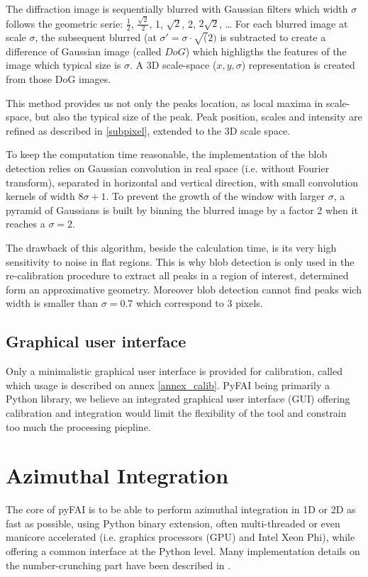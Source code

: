 \documentclass[preprint]{iucr}
\begin{document}
The diffraction image is sequentially blurred with Gaussian filters which
width $\sigma$ follows the geometric serie: $\frac{1}{2}$,
$\frac{\sqrt{2}}{2}$, 1, $\sqrt{2}$, 2, $2\sqrt{2}$, \ldots
For each blurred image at scale $\sigma$, the subsequent blurred (at
$\sigma'=\sigma\cdot\sqrt(2)$
is subtracted to create a difference of Gaussian
image (called $DoG$) which highligths the features of the image which typical
size is $\sigma$. 
A 3D scale-space ($x,y,\sigma$) representation is created from those DoG images.

This method provides us not only the peaks location, as local maxima in
scale-space, but also the typical size of the peak. 
Peak position, scales and intensity are refined as described in
\ref{subpixel}, extended to the 3D scale space.

To keep the computation time reasonable, the implementation of the blob
detection relies on Gaussian convolution in real space (i.e. without Fourier
transform), separated in horizontal and vertical direction, with small
convolution kernels of width $8 \sigma +1$.
To prevent the growth of the window with larger $\sigma$, a pyramid of Gaussians
is built by binning the blurred image by a factor 2 when it reaches a
$\sigma=2$.

The drawback of this algorithm, beside the calculation time, is its very high
sensitivity to noise in flat regions. 
This is why blob detection is only used in the re-calibration procedure to
extract all peaks in a region of interest, determined form an
approximative geometry.
Moreover blob detection cannot find peaks wich width is smaller than  
$\sigma=0.7$ which correspond to 3 pixels.


\subsection{Graphical user interface}
Only a minimalistic graphical user interface is provided for calibration, called 
 which usage is described on annex \ref{annex_calib}.
PyFAI being primarily a Python library, we believe an integrated graphical user
interface (GUI) offering calibration and integration would limit the flexibility
of the tool and constrain too much the processing piepline. 


\section{Azimuthal Integration}

The core of pyFAI is to be able to perform azimuthal integration in 1D or 2D as
fast as possible, using Python binary extension, often multi-threaded or even
manicore accelerated (i.e. graphics processors (GPU) and Intel Xeon Phi), while
offering a common interface at the Python level.
Many implementation details on the number-crunching part have been described in
\cite{kieffer_ashiotis-proc-euroscipy-2014}.
\end{document}
